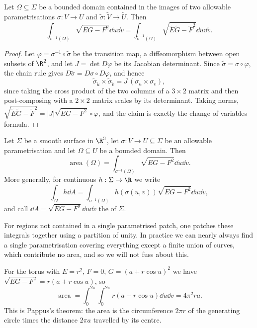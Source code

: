 \begin{lemma}
    Let $\Omega \subseteq \Sigma$ be a bounded domain contained in the images of two allowable parametrisations $\sigma: V \rightarrow U$ and $\tilde\sigma : \tilde V \rightarrow \tilde U$. Then
    $$
    \int_{\sigma^{-1}(\Omega)}\sqrt{EG-F^2}\dd u \dd v = \int_{\tilde\sigma^{-1}(\Omega)}\sqrt{\tilde E \tilde G - \tilde F^2}\dd \tilde u \dd \tilde v.
    $$
\end{lemma}
\begin{proof}
    Let $\varphi = \sigma^{-1}\circ\tilde\sigma$ be the transition map, a diffeomorphism between open subsets of $\R^2$, and let $J = \det D\varphi$ be its Jacobian determinant. Since $\tilde\sigma = \sigma\circ\varphi$, the chain rule gives $D\tilde\sigma = D\sigma \circ D\varphi$, and hence
    $$
    \tilde\sigma_{\tilde u}\times \tilde\sigma_{\tilde v} = J\,(\sigma_u \times \sigma_v),
    $$
    since taking the cross product of the two columns of a $3\times 2$ matrix and then post-composing with a $2\times2$ matrix scales by its determinant. Taking norms, $\sqrt{\tilde E\tilde G - \tilde F^2} = |J| \sqrt{EG-F^2}\circ\varphi$, and the claim is exactly the change of variables formula.
\end{proof}

\begin{definition}[Area]
    Let $\Sigma$ be a smooth surface in $\R^3$, let $\sigma: V \rightarrow U \subseteq \Sigma$ be an allowable parametrisation and let $\Omega \subseteq U$ be a bounded domain. Then
    $$
    \operatorname{area}(\Omega) = \int_{\sigma^{-1}(\Omega)} \sqrt{EG - F^2} \dd u \dd v.
    $$
    More generally, for continuous $h: \Sigma \rightarrow \R$ we write
    $$
    \int_\Omega h \dd A = \int_{\sigma^{-1}(\Omega)} h(\sigma(u,v))\sqrt{EG-F^2}\dd u \dd v,
    $$
    and call $\dd A = \sqrt{EG-F^2}\dd u \dd v$ the  of $\Sigma$.
\end{definition}

\begin{remark}
    For regions not contained in a single parametrised patch, one patches these integrals together using a partition of unity. In practice we can nearly always find a single parametrisation covering everything except a finite union of curves, which contribute no area, and so we will not fuss about this.
\end{remark}

\begin{example}
    For the torus with $E = r^2$, $F= 0$, $G = (a+r\cos u)^2$ we have $\sqrt{EG-F^2} = r(a + r\cos u)$, so
    $$
    \operatorname{area} = \int_0^{2\pi}\int_0^{2\pi} r(a+r\cos u)\dd u \dd v = 4\pi^2 ra.
    $$
    This is Pappus's theorem: the area is the circumference $2\pi r$ of the generating circle times the distance $2\pi a$ travelled by its centre.
\end{example}

